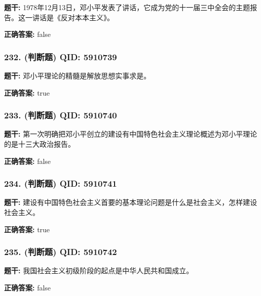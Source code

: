 \documentclass[12pt,UTF8]{ctexart}
\begin{document}
\textbf{题干:}
1978年12月13日，邓小平发表了讲话，它成为党的十一届三中全会的主题报告。这一讲话是《反对本本主义》。

\textbf{正确答案:}
false

\vspace{0.3em}\hrulefill\vspace{0.7em}

\subsubsection*{232. (判断题) \small QID: 5910739}

\textbf{题干:}
邓小平理论的精髓是解放思想实事求是。

\textbf{正确答案:}
true

\vspace{0.3em}\hrulefill\vspace{0.7em}

\subsubsection*{233. (判断题) \small QID: 5910740}

\textbf{题干:}
第一次明确把邓小平创立的建设有中国特色社会主义理论概述为邓小平理论的是十三大政治报告。

\textbf{正确答案:}
false

\vspace{0.3em}\hrulefill\vspace{0.7em}

\subsubsection*{234. (判断题) \small QID: 5910741}

\textbf{题干:}
建设有中国特色社会主义首要的基本理论问题是什么是社会主义，怎样建设社会主义。

\textbf{正确答案:}
true

\vspace{0.3em}\hrulefill\vspace{0.7em}

\subsubsection*{235. (判断题) \small QID: 5910742}

\textbf{题干:}
我国社会主义初级阶段的起点是中华人民共和国成立。

\textbf{正确答案:}
false
\end{document}
